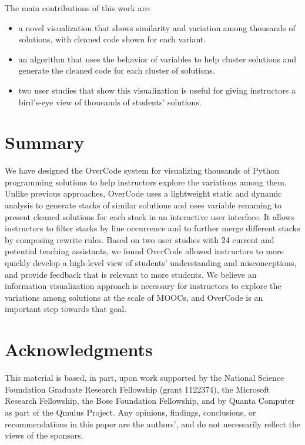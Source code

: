 \documentclass{sigchi}
\begin{document}
The main contributions of this work are:
\begin{itemize}
\item a novel visualization that shows similarity and variation among thousands of solutions, with cleaned code shown for each variant. 
\item an algorithm that uses the behavior of variables to help cluster solutions and generate the cleaned code for each cluster of solutions.
\item two user studies that show this visualization is useful for giving instructors a bird's-eye view of thousands of students' solutions.
\end{itemize}

\section{Summary}
We have designed the OverCode system for visualizing thousands of Python programming solutions to help instructors explore the variations among them. Unlike previous approaches, OverCode uses a lightweight static and dynamic analysis to generate stacks of similar solutions and uses variable renaming to present cleaned solutions for each stack in an interactive user interface. It allows instructors to filter stacks by line occurrence and to further merge different stacks by composing rewrite rules. Based on two user studies with 24 current and potential teaching assistants, we found OverCode allowed instructors to more quickly develop a high-level view of students' understanding and misconceptions, and provide feedback that is relevant to more students. We believe an information visualization approach is necessary for instructors to explore the variations among solutions at the scale of MOOCs, and OverCode is an important step towards that goal. 	

\section{Acknowledgments}

This material is based, in part, upon work supported by the National Science Foundation Graduate Research Fellowship (grant 1122374), the Microsoft Research Fellowship, the Bose Foundation Fellowship, and by Quanta Computer as part of the Qmulus Project. Any opinions, findings, conclusions, or recommendations in this paper are the authors', and do not necessarily reflect the views of the sponsors.
\end{document}
